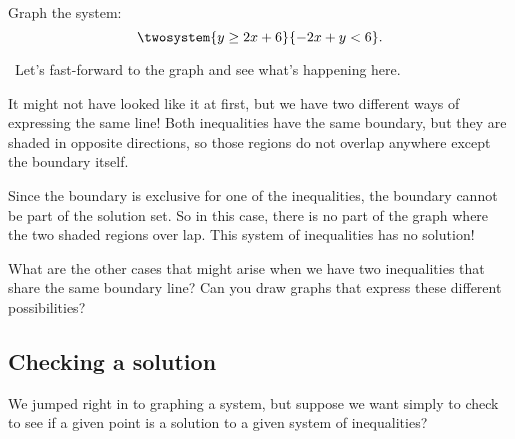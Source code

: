 \begin{boxex}
Graph the system:\[\twosystem{y\geq2x+6}{-2x+y<6}.\]

\exsoln\ Let's fast-forward to the graph and see what's happening here.

\begin{center}
\end{center}

It might not have looked like it at first, but we have two different ways of expressing the same line! Both inequalities have the same boundary, but they are shaded in opposite directions, so those regions do not overlap anywhere except the boundary itself.

Since the boundary is exclusive for one of the inequalities, the boundary cannot be part of the solution set. So in this case, there is no part of the graph where the two shaded regions over lap. This system of inequalities has no solution!
\end{boxex}

What are the other cases that might arise when we have two inequalities that share the same boundary line? Can you draw graphs that express these different possibilities?

\subsection{Checking a solution}

We jumped right in to graphing a system, but suppose we want simply to check to see if a given point is a solution to a given system of inequalities?

